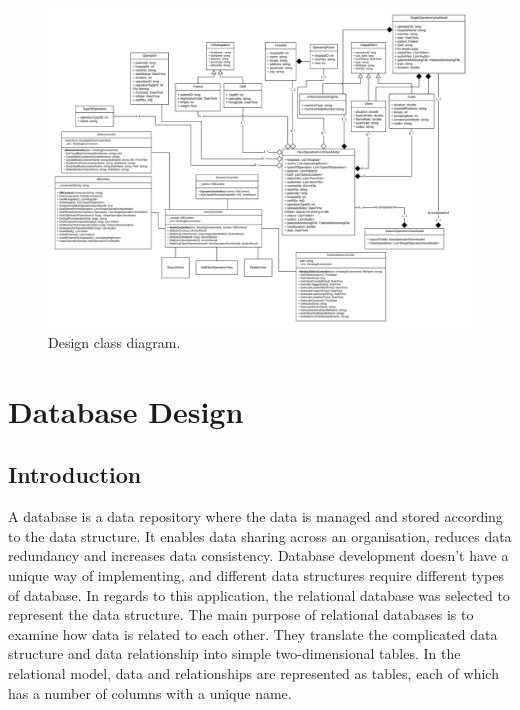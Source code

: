 \clearpage

\begin{landscape}
\begin{figure}[h]
\begin{center}
\thispagestyle{empty}
\includegraphics[width=24cm]{imgs/Design_Diagram.png}
\end{center}\vspace{-0.3cm}
\caption[Design Class Diagram]{Design class diagram.} \label{DesignClassDiagram}
\end{figure}
\end{landscape}
\newpage

 
\section{Database Design}
\label{database_design}

\subsection{Introduction}
\label{sub:intro}
A database is a data repository where the data is managed and stored according to the data structure.  It enables data sharing across an organisation, reduces data redundancy and increases data consistency. Database development doesn't have a unique way of implementing, and different data structures require different types of database. In regards to this application, the relational database was selected to represent the data structure. The main purpose of relational databases is to examine how data is related to each other. They translate the complicated data structure and data relationship into simple two-dimensional tables. In the relational model, data and relationships are represented as tables, each of which has a number of columns with a unique name.


